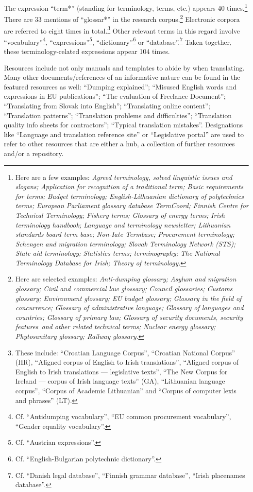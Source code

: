 \documentclass[output=paper]{langsci/langscibook}
\begin{document}
The expression “term*” (standing for terminology, terms, etc.) appears 40 times.\footnote{Here are a few examples: \textit{Agreed terminology, solved linguistic issues and slogans; Application for recognition of a traditional term; Basic requirements for terms; Budget terminology; English-Lithuanian dictionary of polytechnics terms; European Parliament glossary database TermCoord; Finnish Centre for Technical Terminology; Fishery terms; Glossary of energy terms; Irish terminology handbook; Language and terminology newsletter; Lithuanian standards board term base; Non-Iate Termbase; Procurement terminology; Schengen and migration terminology; Slovak Terminology Network (STS); State aid terminology; Statistics terms; terminography; The National Terminology Database for Irish; Theory of terminology.}} There are 33 mentions of “glossar*” in the research corpus.\footnote{Here are selected examples: \textit{Anti-dumping glossary; Asylum and migration glossary; Civil and commercial law glossary; Council glossaries; Customs glossary; Environment glossary; EU budget glossary; Glossary in the field of concurrence; Glossary of administrative language; Glossary of languages and countries; Glossary of primary law; Glossary of security documents, security features~and other related technical terms; Nuclear energy glossary; Phytosanitary glossary; Railway glossary.}} Electronic corpora are referred to eight times in total.\footnote{These include: “Croatian Language Corpus”, “Croatian National Corpus” (HR), “Aligned corpus of English to Irish translations”, “Aligned corpus of English to Irish translations — legislative texts”, “The New Corpus for Ireland — corpus of Irish language texts” (GA), “Lithuanian language corpus”, “Corpus of Academic Lithuanian” and “Corpus of computer lexis and phrases” (LT).} Other relevant terms in this regard involve “vocabulary”\footnote{Cf. “Antidumping vocabulary”, “EU common procurement vocabulary”, “Gender equality vocabulary”.}, “expressions”\footnote{Cf. “Austrian expressions”.}, “dictionary”\footnote{Cf. “English-Bulgarian polytechnic dictionary”.} or “database”.\footnote{Cf. “Danish legal database”, “Finnish grammar database”, “Irish placenames database”.} Taken together, these terminology-related expressions appear 104 times.


Resources include not only manuals and templates to abide by when translating. Many other documents/references of an informative nature can be found in the featured resources as well: “Dumping explained”; “Misused English words and expressions in EU publications”; “The evaluation of Freelance Document”; “Translating from Slovak into English”; “Translating online content”; “Translation patterns”; “Translation problems and difficulties”; “Translation quality info sheets for contractors”; “Typical translation mistakes”. Designations like “Language and translation reference site” or “Legislative portal” are used to refer to other resources that are either a hub, a collection of further resources and/or a repository.
\end{document}
